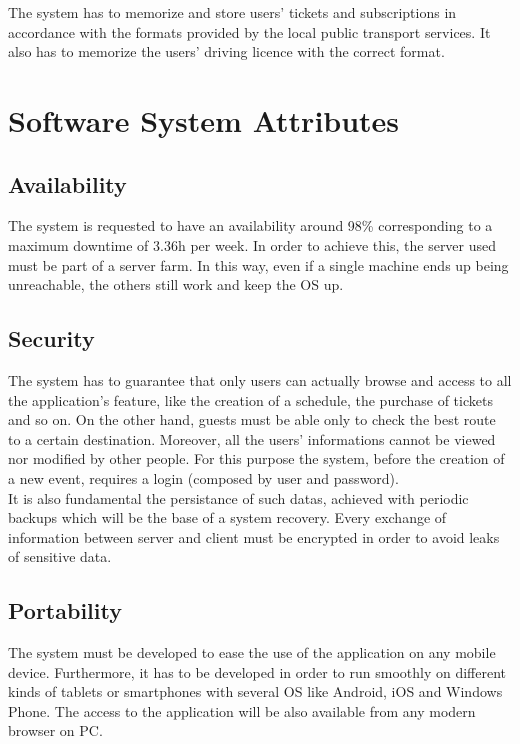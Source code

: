 \documentclass[numbers=noenddot, 12pt, a4paper, oneside]{scrbook}
\begin{document}
The system has to memorize and store users' tickets and subscriptions in accordance with the formats provided by the local public transport services. It also has to memorize the users' driving licence with the correct format.

\section{Software System Attributes}

\subsection*{Availability}

The system is requested to have an availability around 98\% corresponding to a maximum downtime of 3.36h per week. In order to achieve this, the server used must be part of a server farm. In this way, even if a single machine ends up being unreachable, the others still work and keep the OS up.

\subsection*{Security}

The system has to guarantee that only users can actually browse and access to all the application's feature, like the creation of a schedule, the purchase of tickets and so on. On the other hand, guests must be able only to check the best route to a certain destination. Moreover, all the users' informations cannot be viewed nor modified by other people. For this purpose the system, before the creation of a new event, requires a login (composed by user and password).\\

It is also fundamental the persistance of such datas, achieved with periodic backups which will be the base of a system recovery. Every exchange of information between server and client must be encrypted in order to avoid leaks of sensitive data.

\subsection*{Portability}

The system must be developed to ease the use of the application on any mobile device. Furthermore, it has to be developed in order to run smoothly on different kinds of tablets or smartphones with several OS like Android, iOS and Windows Phone. The access to the application will be also available from any modern browser on PC.
\end{document}
